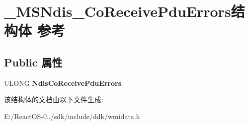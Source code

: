 \hypertarget{struct___m_s_ndis___co_receive_pdu_errors}{}\section{\+\_\+\+M\+S\+Ndis\+\_\+\+Co\+Receive\+Pdu\+Errors结构体 参考}
\label{struct___m_s_ndis___co_receive_pdu_errors}
\subsection*{Public 属性}
\begin{DoxyCompactItemize}
\item 
\mbox{\label{struct___m_s_ndis___co_receive_pdu_errors_abfbb4a77fdd1262d8e2ecb94b464f031}} 
U\+L\+O\+NG {\bfseries Ndis\+Co\+Receive\+Pdu\+Errors}
\end{DoxyCompactItemize}


该结构体的文档由以下文件生成\+:\begin{DoxyCompactItemize}
\item 
E\+:/\+React\+O\+S-\/0../sdk/include/ddk/wmidata.\+h\end{DoxyCompactItemize}
